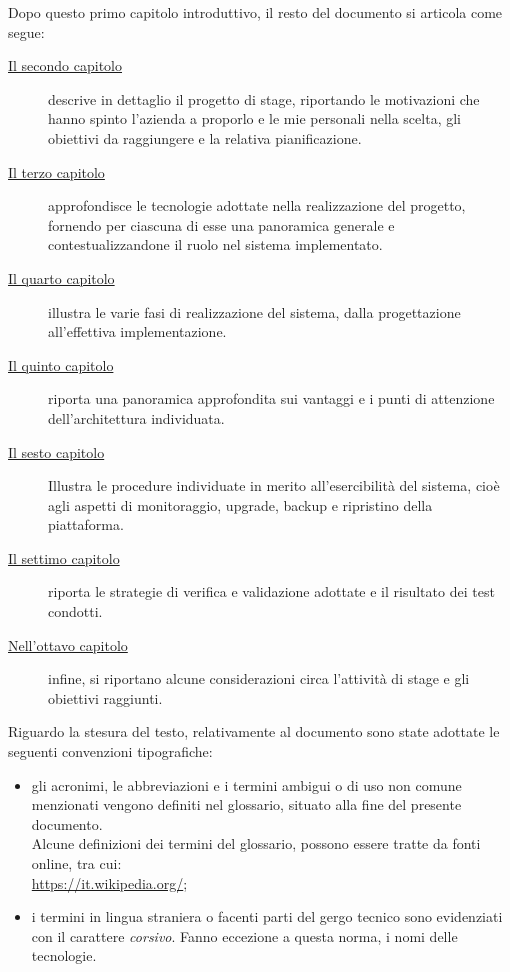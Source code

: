 Dopo questo primo capitolo introduttivo, il resto del documento si articola come segue:

\begin{description}
    
    \item[{\hyperref[cap:lo-stage]{Il secondo capitolo}}] descrive in dettaglio il progetto di stage, riportando le motivazioni che hanno spinto l'azienda a proporlo e le mie personali nella scelta, gli obiettivi da raggiungere e la relativa pianificazione.
    
    \item[{\hyperref[cap:tecnologie-adottate]{Il terzo capitolo}}] approfondisce le tecnologie adottate nella realizzazione del progetto, fornendo per ciascuna di esse una panoramica generale e contestualizzandone il ruolo nel sistema implementato.
    
    \item[{\hyperref[cap:realizzazione-del-sistema]{Il quarto capitolo}}] illustra le varie fasi di realizzazione del sistema, dalla progettazione all'effettiva implementazione.
    
    \item[{\hyperref[cap:vantaggi-e-punti-di-attenzione]{Il quinto capitolo}}]riporta una panoramica approfondita sui vantaggi e i punti di attenzione dell'architettura individuata.
    
    \item[{\hyperref[cap:esercibilità]{Il sesto capitolo}}]Illustra le procedure individuate in merito all'esercibilità del sistema, cioè agli aspetti di monitoraggio, upgrade, backup e ripristino della piattaforma.
        
    \item[{\hyperref[cap:verifica-validazione]{Il settimo capitolo}}] riporta le strategie di verifica e validazione adottate e il risultato dei test condotti.
    
    \item[{\hyperref[cap:conclusioni]{Nell'ottavo capitolo}}] infine, si riportano alcune considerazioni circa l'attività di stage e gli obiettivi raggiunti.
\end{description}

Riguardo la stesura del testo, relativamente al documento sono state adottate le seguenti convenzioni tipografiche:
\begin{itemize}
	\item gli acronimi, le abbreviazioni e i termini ambigui o di uso non comune menzionati vengono definiti nel glossario, situato alla fine del presente documento. \\
    Alcune definizioni dei termini del glossario, possono essere tratte da fonti online, tra cui: \\ 
    \url{https://it.wikipedia.org/};
	\item i termini in lingua straniera o facenti parti del gergo tecnico sono evidenziati con il carattere \emph{corsivo}. Fanno eccezione a questa norma, i nomi delle tecnologie.
\end{itemize}